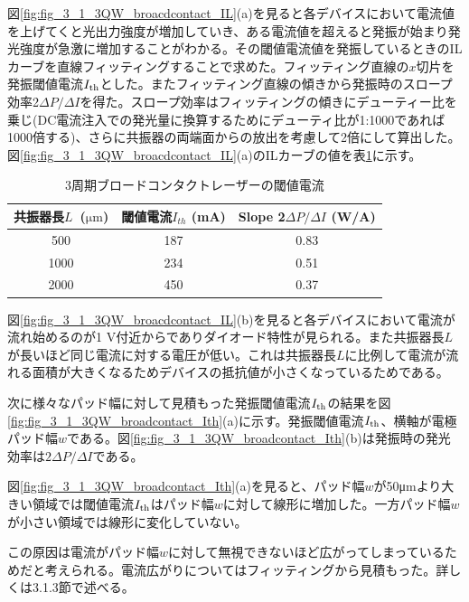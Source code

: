 図\ref{fig:fig_3_1_3QW_broacdcontact_IL}(a)を見ると各デバイスにおいて電流値を上げてくと光出力強度が増加していき、ある電流値を超えると発振が始まり発光強度が急激に増加することがわかる。その閾値電流値を発振しているときのILカーブを直線フィッティングすることで求めた。フィッティング直線の$x$切片を発振閾値電流$I_{\rm{th}}$とした。またフィッティング直線の傾きから発振時のスロープ効率2$\Delta P/\Delta I$を得た。スロープ効率はフィッティングの傾きにデューティー比を乗じ(DC電流注入での発光量に換算するためにデューティ比が1:1000であれば1000倍する)、さらに共振器の両端面からの放出を考慮して2倍にして算出した。
図\ref{fig:fig_3_1_3QW_broacdcontact_IL}(a)のILカーブの値を表\ref{table:table_3_1_3QW_broadcontact}に示す。
\begin{table}[h]
  \caption{3周期ブロードコンタクトレーザーの閾値電流}
  \label{table:table_3_1_3QW_broadcontact}
  \centering
  \begin{tabular}{ccc}
    \hline
    共振器長$L$\ ($\si{\micro\metre}$)  & 閾値電流$I_{th}$ (mA)  & Slope 2$\Delta P/\Delta I$ (W/A) \\
    \hline \hline
     500& 187&  0.83  \\
    1000& 234& 0.51\\
    2000& 450&0.37\\
       \hline
  \end{tabular}
\end{table}



図\ref{fig:fig_3_1_3QW_broacdcontact_IL}(b)を見ると各デバイスにおいて電流が流れ始めるのが1 V付近からでありダイオード特性が見られる。また共振器長$L$が長いほど同じ電流に対する電圧が低い。これは共振器長$L$に比例して電流が流れる面積が大きくなるためデバイスの抵抗値が小さくなっているためである。


次に様々なパッド幅に対して見積もった発振閾値電流$I_{\rm{th}}$の結果を図\ref{fig:fig_3_1_3QW_broadcontact_Ith}(a)に示す。発振閾値電流$I_{\rm{th}}$、横軸が電極パッド幅$w$である。図\ref{fig:fig_3_1_3QW_broadcontact_Ith}(b)は発振時の発光効率は$2 \Delta P/\Delta I$である。

図\ref{fig:fig_3_1_3QW_broadcontact_Ith}(a)を見ると、パッド幅$w$が50\si{ \micro\metre}より大きい領域では閾値電流$I_{\rm{th}}$はパッド幅$w$に対して線形に増加した。一方パッド幅$w$が小さい領域では線形に変化していない。

この原因は電流がパッド幅$w$に対して無視できないほど広がってしまっているためだと考えられる。電流広がりについてはフィッティングから見積もった。詳しくは3.1.3節で述べる。

